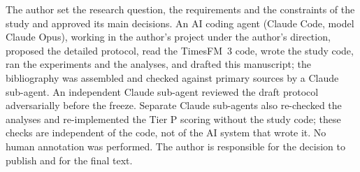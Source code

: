 The author set the research question, the requirements and the constraints of the study and approved its main decisions. An AI
coding agent (Claude Code, model Claude Opus), working in the author's project under the author's direction, proposed the detailed
protocol, read the TimesFM~3 code, wrote the study code, ran the experiments and the analyses, and drafted this manuscript; the
bibliography was assembled and checked against primary sources by a Claude sub-agent. An independent Claude sub-agent reviewed the
draft protocol adversarially before the freeze. Separate Claude sub-agents also re-checked the analyses and
re-implemented the Tier P scoring without the study code; these checks are independent of the code, not of the AI system that wrote
it. No human annotation was performed. The author is responsible for the decision to
publish and for the final text.
